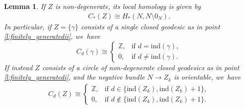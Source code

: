 \documentclass[11pt]{article}
\newcommand{\Z}{\mathbb{Z}}
\newcommand{\ind}{\mathrm{ind}}
\theoremstyle{plain}
\newtheorem{Lemma}[Thm]{Lemma}
\theoremstyle{definition}
\begin{document}
\begin{Lemma}\label{l:non_deg_visible}
If $Z$ is non-degenerate, its local homology is given by
\begin{align*}
C_*(Z)\cong H_*(N,N\setminus0_N).
\end{align*}
In particular, if $Z=\{\gamma\}$ consists of a single closed geodesic as in point \eqref{l:finitely_generatedii}, we~have
\[
C_d(\gamma)
\cong
\begin{cases}
\Z, & \mbox{if } d=\ind(\gamma), \\
0, & \mbox{if } d\neq\ind(\gamma).
\end{cases}
\]
If instead $Z$ consists of a circle of non-degenerate closed geodesics as in point \eqref{l:finitely_generatedi}, and the negative bundle $N\to Z_k$ is orientable, we~have
\begin{align}
\label{e:loc_hom_circle}
C_d(Z)
\cong
\begin{cases}
\Z, & \mbox{if } d\in\{\ind(Z_k),\ind(Z_k)+1\}, \\
0, & \mbox{if }d\not\in\{\ind(Z_k),\ind(Z_k)+1\}.
\end{cases}
\end{align}
\end{Lemma}
\end{document}
